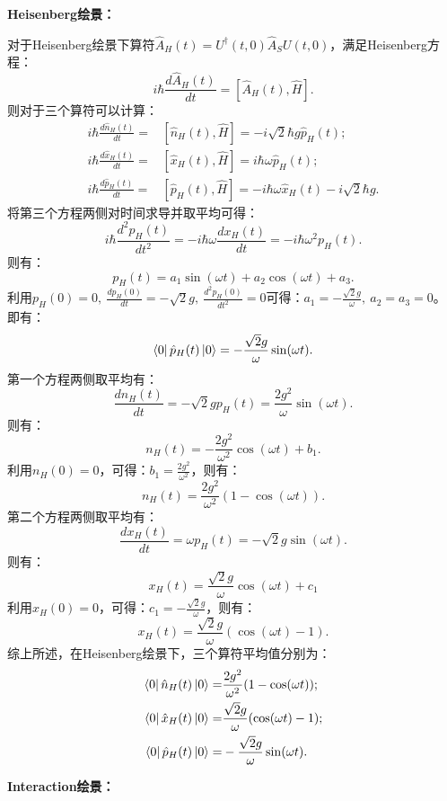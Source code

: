 \documentclass[reqno,a4paper,12pt]{amsart}
\begin{document}
\begin{tcolorbox}[breakable, colback = black!5!white, colframe = black]
\textbf{Heisenberg绘景：}

对于Heisenberg绘景下算符$\hat{A}_H(t) = U^\dagger(t,0) \hat{A}_S U(t,0)$，满足Heisenberg方程：
\[
	i\hbar \frac{d \hat{A}_H(t)}{dt} = [\hat{A}_H(t), \hat{H}].
\]
则对于三个算符可以计算：
\begin{align*}
	i\hbar \frac{d\hat{n}_H(t)}{dt} =& [\hat{n}_H(t), \hat{H}] = -i\sqrt{2} \hbar g \hat{p}_H(t); \\
	i\hbar \frac{d\hat{x}_H(t)}{dt} =& [\hat{x}_H(t), \hat{H}] = i\hbar\omega \hat{p}_H(t); \\
	i\hbar \frac{d\hat{p}_H(t)}{dt} =& [\hat{p}_H(t), \hat{H}] = -i\hbar\omega \hat{x}_H(t) - i\sqrt{2}\hbar g.
\end{align*}
将第三个方程两侧对时间求导并取平均可得：
\[
	i\hbar \frac{d^2p_H(t)}{dt^2} = -i\hbar\omega \frac{d x_H(t)}{dt} = -i\hbar\omega^2p_H(t).
\]
则有：
\[
	p_H(t) = a_1\sin(\omega t) + a_2 \cos(\omega t) + a_3.
\]
利用$p_H(0) = 0, \ \frac{dp_H(0)}{dt} = -\sqrt{2}g, \ \frac{d^2p_H(0)}{dt^2} = 0$可得：$a_1=-\frac{\sqrt{2}g}{\omega}, \ a_2 = a_3 = 0$。
即有：
\[
	\bra{0} \hat{p}_H(t) \ket{0} = -\frac{\sqrt{2}g}{\omega} \sin(\omega t).
\]
第一个方程两侧取平均有：
\[
	\frac{dn_H(t)}{dt} = -\sqrt{2}g p_H(t) = \frac{2g^2}{\omega}\sin(\omega t).
\]
则有：
\[
	n_H(t) = -\frac{2g^2}{\omega^2} \cos(\omega t) + b_1.
\]
利用$n_H(0) = 0$，可得：$b_1 = \frac{2g^2}{\omega^2}$，则有：
\[
	n_H(t) = \frac{2g^2}{\omega^2}(1-\cos(\omega t)).
\]
第二个方程两侧取平均有：
\[
	\frac{dx_H(t)}{dt} = \omega p_H(t) = -\sqrt{2}g \sin(\omega t).
\]
则有：
\[
	x_H(t) = \frac{\sqrt{2}g}{\omega}\cos(\omega t) + c_1
\]
利用$x_H(0) = 0$，可得：$c_1 = -\frac{\sqrt{2}g}{\omega}$，则有：
\[
	x_H(t) = \frac{\sqrt{2}g}{\omega}(\cos(\omega t)- 1).
\]
综上所述，在Heisenberg绘景下，三个算符平均值分别为：
\begin{align*}
	\bra{0} \hat{n}_H(t) \ket{0} =& \frac{2g^2}{\omega^2}(1-\cos(\omega t)); \\
	\bra{0} \hat{x}_H(t) \ket{0} =& \frac{\sqrt{2}g}{\omega}(\cos(\omega t)- 1); \\
	\bra{0} \hat{p}_H(t) \ket{0} =& -\frac{\sqrt{2}g}{\omega} \sin(\omega t).
\end{align*}

\textbf{Interaction绘景：}


\end{tcolorbox}
\end{document}
